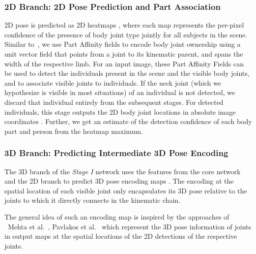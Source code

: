 \documentclass[acmtog,authorversion]{acmart}
\newcommand{\etal}{et al.}
\begin{document}
\subsubsection{2D Branch: 2D Pose Prediction and Part Association}
2D pose is predicted as 2D heatmaps , where each map represents the per-pixel confidence of the presence of body joint type  jointly for all subjects in the scene. 
Similar to~\cite{cao_affinity_2017}, we use Part Affinity fields  to encode body joint ownership using a unit vector field that points from a joint to its kinematic parent, and spans the width of the respective limb. 
For an input image, these Part Affinity Fields can be used to detect the individuals present in the scene and the visible body joints, and to associate visible joints to individuals. 
If the neck joint (which we hypothesize is visible in most situations) of an individual is not detected, we discard that individual entirely from the subsequent stages. 
For  detected individuals, this stage outputs the 2D body joint locations in absolute image coordinates . 
Further, we get an estimate of the detection confidence  of each body part  and person  from the heatmap maximum.



\subsubsection{3D Branch: Predicting Intermediate 3D Pose Encoding}
\label{sec:pose_formulation}

The 3D branch of the \textit{Stage I} network uses the features from the core network and the 2D branch to predict 3D pose encoding maps . 
The encoding at the spatial location of each visible joint only encapsulates its 3D pose relative to the joints to which it directly connects in the kinematic chain. 

The general idea of such an encoding map is inspired by the approaches of ~Mehta \etal~, Pavlakos \etal~ which represent the 3D pose information of joints in output maps at the spatial locations of the 2D detections of the respective joints.
\end{document}
